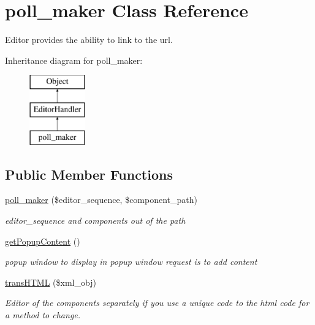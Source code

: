 \hypertarget{classpoll__maker}{\section{poll\+\_\+maker Class Reference}
\label{classpoll__maker}
}


Editor provides the ability to link to the url.  


Inheritance diagram for poll\+\_\+maker\+:\begin{figure}[H]
\begin{center}
\leavevmode
\includegraphics[height=3.000000cm]{classpoll__maker}
\end{center}
\end{figure}
\subsection*{Public Member Functions}
\begin{DoxyCompactItemize}
\item 
\hyperlink{classpoll__maker_ae8956a214b15ddd49a3e7538a15791ba}{poll\+\_\+maker} (\$editor\+\_\+sequence, \$component\+\_\+path)
\begin{DoxyCompactList}\small\item\em editor\+\_\+sequence and components out of the path \end{DoxyCompactList}\item 
\hyperlink{classpoll__maker_aa332538c710974acc59a6209bb1f5503}{get\+Popup\+Content} ()
\begin{DoxyCompactList}\small\item\em popup window to display in popup window request is to add content \end{DoxyCompactList}\item 
\hyperlink{classpoll__maker_ac8d4b0f45f16016ad7f711123cc98ea8}{trans\+H\+T\+M\+L} (\$xml\+\_\+obj)
\begin{DoxyCompactList}\small\item\em Editor of the components separately if you use a unique code to the html code for a method to change. \end{DoxyCompactList}\end{DoxyCompactItemize}
